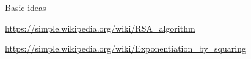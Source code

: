 
 {Basic ideas}

\url{https://simple.wikipedia.org/wiki/RSA_algorithm}

\url{https://simple.wikipedia.org/wiki/Exponentiation_by_squaring}
